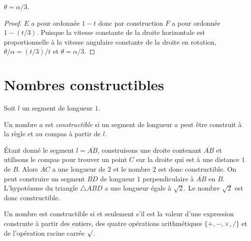 \begin{theorem}
$\theta = \alpha/3$.
\end{theorem}
\begin{proof}
$E$ a pour ordonnée $1-t$ donc par construction $F$ a pour ordonnée $1-(t/3)$. Puisque la vitesse constante de la droite horizontale est proportionnelle à la vitesse angulaire constante de la droite en rotation, $\theta/\alpha = (t/3)/t$ et $\theta = \alpha/3$.
\end{proof}


\section{Nombres constructibles}\label{s.trisect-constructible}


Soit $l$ un segment  de longueur $1$.

\begin{definition}
Un nombre $a$ est \emph{constructible} si un segment  de longueur $a$ peut être construit à la règle et au  compas à partir de $l$.
\end{definition}

Étant donné le segment $l=\overline{AB}$, construisons une droite contenant $\overline{AB}$ et utilisons le compas pour trouver un point $C$ sur la droite qui est à une distance $1$ de $B$. Alors $\overline{AC}$ a une longueur de $2$ et le nombre $2$ est donc constructible. On peut construire un segment  $\overline{BD}$ de longueur $1$ perpendiculaire à $\overline{AB}$ en $B$. L'hypoténuse du triangle $\triangle ABD$ a une longueur égale à $\sqrt{2}$. Le nombre $\sqrt{2}$ est donc constructible.

\begin{theorem}\label{thm.trisect-constructible}
Un nombre est constructible si et seulement s'il est la valeur d'une expression construite à partir des entiers, des quatre opérations arithmétiques $\{+,-,\times,/\}$ et de l'opération racine carrée $\surd$.
\end{theorem}

